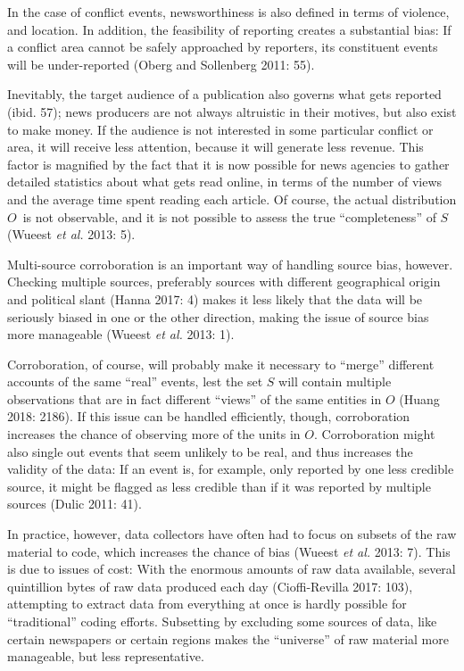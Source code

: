 \documentclass[12pt,twoside]{reedthesis}
\begin{document}
In the case of conflict events, newsworthiness is also defined in terms
of violence, and location. In addition, the feasibility of reporting
creates a substantial bias: If a conflict area cannot be safely
approached by reporters, its constituent events will be under-reported
(Oberg and Sollenberg 2011: 55).

Inevitably, the target audience of a publication also governs what gets
reported (ibid. 57); news producers are not always altruistic in their
motives, but also exist to make money. If the audience is not interested
in some particular conflict or area, it will receive less attention,
because it will generate less revenue. This factor is magnified by the
fact that it is now possible for news agencies to gather detailed
statistics about what gets read online, in terms of the number of views
and the average time spent reading each article. Of course, the actual
distribution \(O\)~is not observable, and it is not possible to assess
the true ``completeness'' of \(S\) (Wueest \emph{et al.} 2013: 5).

Multi-source corroboration is an important way of handling source bias,
however. Checking multiple sources, preferably sources with different
geographical origin and political slant (Hanna 2017: 4) makes it less
likely that the data will be seriously biased in one or the other
direction, making the issue of source bias more manageable (Wueest
\emph{et al.} 2013: 1).

Corroboration, of course, will probably make it necessary to ``merge''
different accounts of the same ``real'' events, lest the set \(S\) will
contain multiple observations that are in fact different ``views'' of
the same entities in \(O\) (Huang 2018: 2186). If this issue can be
handled efficiently, though, corroboration increases the chance of
observing more of the units in \(O\). Corroboration might also single
out events that seem unlikely to be real, and thus increases the
validity of the data: If an event is, for example, only reported by one
less credible source, it might be flagged as less credible than if it
was reported by multiple sources (Dulic 2011: 41).

In practice, however, data collectors have often had to focus on subsets
of the raw material to code, which increases the chance of bias (Wueest
\emph{et al.} 2013: 7). This is due to issues of cost: With the enormous
amounts of raw data available, several quintillion bytes of raw data
produced each day (Cioffi-Revilla 2017: 103), attempting to extract data
from everything at once is hardly possible for ``traditional'' coding
efforts. Subsetting by excluding some sources of data, like certain
newspapers or certain regions makes the ``universe'' of raw material
more manageable, but less representative.
\end{document}
